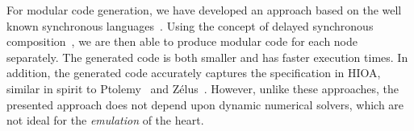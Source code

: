 
 For modular code generation, we
have developed an approach based on the well known synchronous
languages~\cite{benveniste03}. %
Using the concept of delayed synchronous composition~\cite{SlLanguage},
we are then able to produce modular code for each node separately. The
generated code is both smaller and has faster execution times. In addition,
the generated code accurately captures the specification in \ac{HIOA},
similar in spirit to Ptolemy~\cite{ptolemaeus2014system} and
Z\'{e}lus~\cite{bourke13zelus}. However, unlike these approaches, the
presented approach does not depend upon dynamic numerical solvers, which
are not ideal for the \textit{emulation} of the heart.

